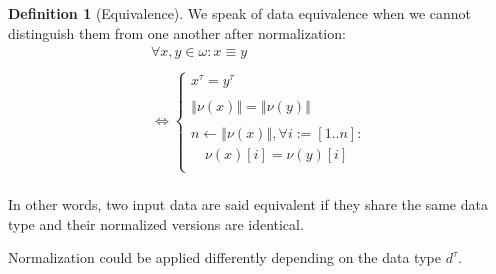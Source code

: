 \documentclass[twoside,twocolumn]{article}
\newcommand{\norm}[1]{\left\Vert#1\right\Vert}
\theoremstyle{definition}
\newtheorem{definition}{Definition}
\theoremstyle{remark}
\begin{document}
\begin{definition}[Equivalence]
    \label{equivalence}
    We speak of data equivalence when we cannot distinguish them from one another after normalization:
    \begin{equation}
        \label{eq:equivalence}
        \begin{array}{l}
            \forall x, y \in \omega: x \equiv y \\ \\
            \iff \left\{
                \begin{array}{l}
                    x^\tau = y^\tau \\ \\
                    \norm{\nu(x)} = \norm{\nu(y)} \\ \\
                    n \gets \norm{\nu(x)}, \forall i := [1..n]: \\
                        \quad \nu(x)[i] = \nu(y)[i] \\
                \end{array}
            \right. \\
            \end{array}
    \end{equation}

    In other words, two input data are said equivalent if they share the same data type and their normalized versions are identical.
\end{definition}

Normalization could be applied differently depending on the data type $d^\tau$.
\end{document}
